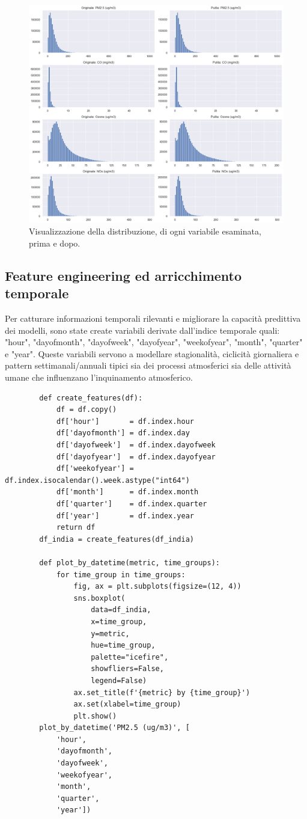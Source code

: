 \documentclass[a4paper,12pt]{report}
\begin{document}
	\begin{figure}[H]
		\centering
		\includegraphics[width=1.0\textwidth]{img/distr_prepost_isofor_pm.png}
		\caption{Visualizzazione della distribuzione, di ogni variabile esaminata, prima e dopo.}
	\end{figure}
	
	\subsection{Feature engineering ed arricchimento temporale}
	Per catturare informazioni temporali rilevanti e migliorare la capacità predittiva dei modelli, sono state create variabili derivate dall'indice temporale quali: "hour", "dayofmonth", "dayofweek", "dayofyear", "weekofyear", "month", "quarter" e "year". Queste variabili servono a modellare stagionalità, ciclicità giornaliera e pattern settimanali/annuali tipici sia dei processi atmosferici sia delle attività umane che influenzano l’inquinamento atmosferico.
	
	\begin{verbatim}
		def create_features(df):
			df = df.copy()
			df['hour']       = df.index.hour
			df['dayofmonth'] = df.index.day
			df['dayofweek']  = df.index.dayofweek
			df['dayofyear']  = df.index.dayofyear
			df['weekofyear'] = df.index.isocalendar().week.astype("int64")
			df['month']      = df.index.month
			df['quarter']    = df.index.quarter
			df['year']       = df.index.year
			return df
		df_india = create_features(df_india)
		
		def plot_by_datetime(metric, time_groups):
			for time_group in time_groups:
				fig, ax = plt.subplots(figsize=(12, 4))
				sns.boxplot(
					data=df_india, 
					x=time_group, 
					y=metric, 
					hue=time_group, 
					palette="icefire", 
					showfliers=False, 
					legend=False)
				ax.set_title(f'{metric} by {time_group}')
				ax.set(xlabel=time_group)
				plt.show()
		plot_by_datetime('PM2.5 (ug/m3)', [
			'hour', 
			'dayofmonth', 
			'dayofweek', 
			'weekofyear', 
			'month', 
			'quarter', 
			'year'])
	\end{verbatim}
	
\end{document}
